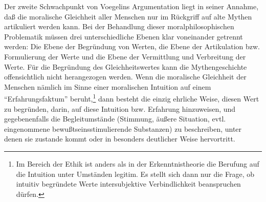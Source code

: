 Der zweite Schwachpunkt von Voegelins Argumentation liegt in seiner Annahme,
daß die moralische Gleichheit aller Menschen nur im Rückgriff auf alte Mythen
artikuliert werden kann. Bei der Behandlung dieser moralphilosophischen
Problematik müssen drei unterschiedliche Ebenen klar voneinander getrennt
werden: Die Ebene der Begründung von Werten, die Ebene der Artikulation bzw.
Formulierung der Werte und die Ebene der Vermittlung und Verbreitung der
Werte. Für die Begründung des Gleichheitswertes kann die Mythengeschichte
offensichtlich nicht herangezogen werden. Wenn die moralische Gleichheit der
Menschen nämlich im Sinne einer moralischen Intuition auf einem
"`Erfahrungsfaktum"' beruht,\footnote{Im Bereich der Ethik ist anders als in
  der Erkenntnistheorie die Berufung auf die Intuition unter Umständen
  legitim. Es stellt sich dann nur die Frage, ob intuitiv begründete Werte
  intersubjektive Verbindlichkeit beanspruchen dürfen.} dann besteht die
einzig ehrliche Weise, diesen Wert zu begründen, darin, auf diese Intuition
bzw.  Erfahrung hinzuweisen, und gegebenenfalls die Begleitumstände (Stimmung,
äußere Situation, evtl. eingenommene bewußtseinsstimulierende Substanzen) zu
beschreiben, unter denen sie zustande kommt oder in besonders deutlicher Weise
hervortritt.

